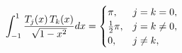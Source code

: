 \[\int_{-1}^{1}\frac{\mathop{T_{j}\/}\nolimits\!\left(x\right)\mathop{T_{k}\/}%
\nolimits\!\left(x\right)}{\sqrt{1-x^{2}}}dx=\begin{cases}\pi,&j=k=0,\\
\frac{1}{2}\pi,&j=k\neq 0,\\
0,&j\neq k,\end{cases}\]